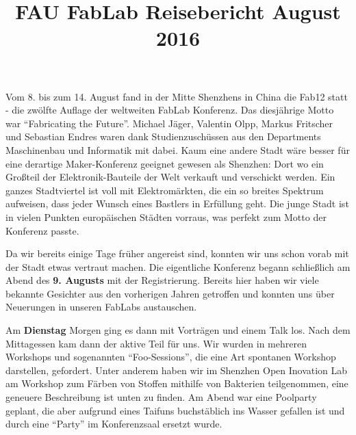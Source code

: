 \documentclass{\basedir/fablab-document}
\title{FAU FabLab Reisebericht August 2016}
\begin{document}
\begin{figure}[htb]
	\noindent{}
\end{figure}

\section*{}

Vom 8. bis zum 14. August fand in der Mitte Shenzhens in China die Fab12
statt - die zwölfte Auflage der weltweiten FabLab Konferenz. Das
diesjährige Motto war ``Fabricating the Future''. Michael Jäger,
Valentin Olpp, Markus Fritscher und Sebastian Endres waren dank
Studienzuschüssen aus den Departments Maschinenbau und Informatik mit
dabei. Kaum eine andere Stadt wäre besser für eine derartige
Maker-Konferenz geeignet gewesen als Shenzhen: Dort wo ein Großteil der
Elektronik-Bauteile der Welt verkauft und verschickt werden. Ein ganzes
Stadtviertel ist voll mit Elektromärkten, die ein so breites Spektrum
aufweisen, dass jeder Wunsch eines Bastlers in Erfüllung geht. Die junge
Stadt ist in vielen Punkten europäischen Städten vorraus, was perfekt
zum Motto der Konferenz passte.

Da wir bereits einige Tage früher angereist sind, konnten wir uns schon
vorab mit der Stadt etwas vertraut machen. Die eigentliche Konferenz
begann schließlich am Abend des \textbf{9. Augusts} mit der
Registrierung. Bereits hier haben wir viele bekannte Gesichter aus den
vorherigen Jahren getroffen und konnten uns über Neuerungen in unseren
FabLabs austauschen.

Am \textbf{Dienstag} Morgen ging es dann mit Vorträgen und einem Talk
los. Nach dem Mittagessen kam dann der aktive Teil für uns. Wir wurden
in mehreren Workshops und sogenannten ``Foo-Sessions'', die eine Art
spontanen Workshop darstellen, gefordert. Unter anderem haben wir im
Shenzhen Open Inovation Lab am Workshop zum Färben von Stoffen mithilfe
von Bakterien teilgenommen, eine geneuere Beschreibung ist unten zu
finden. Am Abend war eine Poolparty geplant, die aber aufgrund eines
Taifuns buchstäblich ins Wasser gefallen ist und durch eine ``Party'' im
Konferenzsaal ersetzt wurde.
\end{document}
